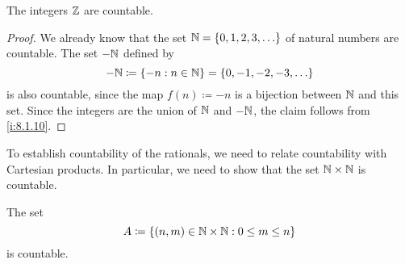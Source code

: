 \begin{cor}\label{i:8.1.11}
  The integers \(\mathbb{Z}\) are countable.
\end{cor}

\begin{proof}
  We already know that the set \(\N = \set{0, 1, 2, 3, \dots}\) of natural numbers are countable.
  The set \(-\mathbb{N}\) defined by
  \[
    -\N \coloneqq \set{-n : n \in \N} = \set{0, -1, -2, -3, \dots}
  \]
  is also countable, since the map \(f(n) \coloneqq -n\) is a bijection between \(\mathbb{N}\) and this set.
  Since the integers are the union of \(\mathbb{N}\) and \(-\mathbb{N}\), the claim follows from \cref{i:8.1.10}.
\end{proof}

\begin{note}
  To establish countability of the rationals, we need to relate countability with Cartesian products.
  In particular, we need to show that the set \(\mathbb{N} \times \mathbb{N}\) is countable.
\end{note}

\begin{lem}\label{i:8.1.12}
  The set
  \[
    A \coloneqq \left\lbrace(n, m) \in \mathbb{N} \times \mathbb{N} : 0 \leq m \leq n\right\rbrace
  \]
  is countable.
\end{lem}

